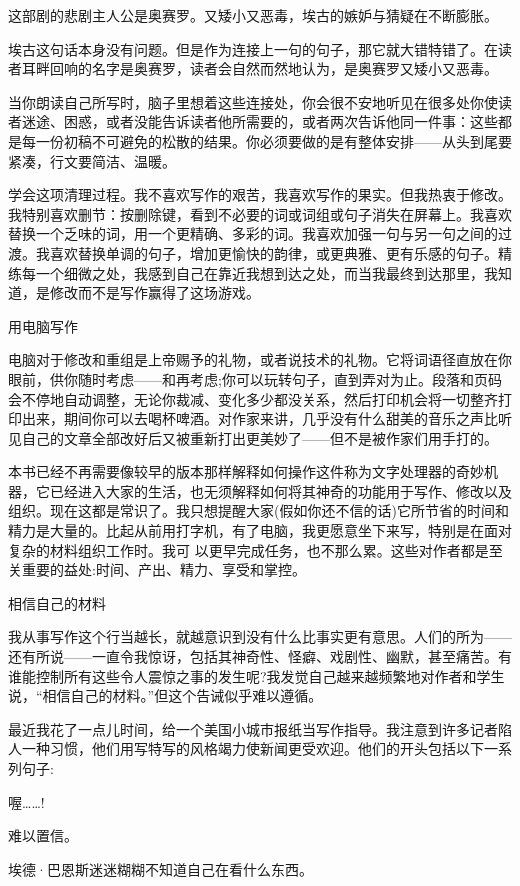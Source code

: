 这部剧的悲剧主人公是奥赛罗。又矮小又恶毒，埃古的嫉妒与猜疑在不断膨胀。

埃古这句话本身没有问题。但是作为连接上一句的句子，那它就大错特错了。在读者耳畔回响的名字是奥赛罗，读者会自然而然地认为，是奥赛罗又矮小又恶毒。

当你朗读自己所写时，脑子里想着这些连接处，你会很不安地听见在很多处你使读者迷途、困惑，或者没能告诉读者他所需要的，或者两次告诉他同一件事：这些都是每一份初稿不可避免的松散的结果。你必须要做的是有整体安排——从头到尾要紧凑，行文要简洁、温暖。

学会这项清理过程。我不喜欢写作的艰苦，我喜欢写作的果实。但我热衷于修改。我特别喜欢删节：按删除键，看到不必要的词或词组或句子消失在屏幕上。我喜欢替换一个乏味的词，用一个更精确、多彩的词。我喜欢加强一句与另一句之间的过渡。我喜欢替换单调的句子，增加更愉快的韵律，或更典雅、更有乐感的句子。精练每一个细微之处，我感到自己在靠近我想到达之处，而当我最终到达那里，我知道，是修改而不是写作赢得了这场游戏。

用电脑写作

电脑对于修改和重组是上帝赐予的礼物，或者说技术的礼物。它将词语径直放在你眼前，供你随时考虑——和再考虑;你可以玩转句子，直到弄对为止。段落和页码会不停地自动调整，无论你裁减、变化多少都没关系，然后打印机会将一切整齐打印出来，期间你可以去喝杯啤酒。对作家来讲，几乎没有什么甜美的音乐之声比听见自己的文章全部改好后又被重新打出更美妙了——但不是被作家们用手打的。

本书已经不再需要像较早的版本那样解释如何操作这件称为文字处理器的奇妙机器，它已经进入大家的生活，也无须解释如何将其神奇的功能用于写作、修改以及组织。现在这都是常识了。我只想提醒大家(假如你还不信的话)它所节省的时间和精力是大量的。比起从前用打字机，有了电脑，我更愿意坐下来写，特别是在面对复杂的材料组织工作时。我可 以更早完成任务，也不那么累。这些对作者都是至关重要的益处:时间、产出、精力、享受和掌控。

相信自己的材料

我从事写作这个行当越长，就越意识到没有什么比事实更有意思。人们的所为——还有所说——一直令我惊讶，包括其神奇性、怪癖、戏剧性、幽默，甚至痛苦。有谁能控制所有这些令人震惊之事的发生呢?我发觉自己越来越频繁地对作者和学生说，“相信自己的材料。”但这个告诫似乎难以遵循。

最近我花了一点儿时间，给一个美国小城市报纸当写作指导。我注意到许多记者陷人一种习惯，他们用写特写的风格竭力使新闻更受欢迎。他们的开头包括以下一系列句子:

喔……!

难以置信。

埃德·巴恩斯迷迷糊糊不知道自己在看什么东西。

